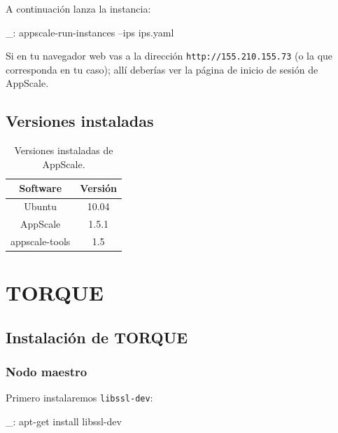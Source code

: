 A continuación lanza la instancia:

\begin{bashcode}
_: appscale-run-instances --ips ips.yaml
\end{bashcode}

Si en tu navegador web vas a la dirección \texttt{http://155.210.155.73} (o la que corresponda en tu caso); allí deberías ver la página de inicio de sesión de AppScale.


\pagebreak
\subsection{Versiones instaladas}

\begin{table}[!htbp]
\centering
   \begin{tabular}{|c|c|}
      \hline
      \textbf{Software} & \textbf{Versión} \\ \hline
      Ubuntu & 10.04 \\ \hline
      AppScale & 1.5.1 \\ \hline
      appscale-tools & 1.5 \\ \hline
   \end{tabular}
\caption{Versiones instaladas de AppScale.}
\label{table:puppet-versions}
\end{table}


\section{TORQUE}
\label{anx:inst-torque}


\subsection{Instalación de TORQUE}


\subsubsection{Nodo maestro}

Primero instalaremos \texttt{libssl-dev}:

\begin{bashcode}
_: apt-get install libssl-dev
\end{bashcode}


